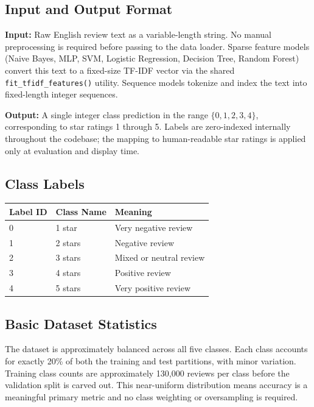 \documentclass[12pt]{article}
\begin{document}
\subsection{Input and Output Format}

\textbf{Input:} Raw English review text as a variable-length string. No manual preprocessing is required before passing to the data loader. Sparse feature models (Naive Bayes, MLP, SVM, Logistic Regression, Decision Tree, Random Forest) convert this text to a fixed-size TF-IDF vector via the shared \texttt{fit\_tfidf\_features()} utility. Sequence models tokenize and index the text into fixed-length integer sequences.

\textbf{Output:} A single integer class prediction in the range $\{0, 1, 2, 3, 4\}$, corresponding to star ratings 1 through 5. Labels are zero-indexed internally throughout the codebase; the mapping to human-readable star ratings is applied only at evaluation and display time.

\subsection{Class Labels}

\begin{table}[H]
    \centering
    \begin{tabular}{lll}
        \toprule
        Label ID & Class Name & Meaning \\
        \midrule
        0        & 1 star     & Very negative review \\
        1        & 2 stars    & Negative review \\
        2        & 3 stars    & Mixed or neutral review \\
        3        & 4 stars    & Positive review \\
        4        & 5 stars    & Very positive review \\
        \bottomrule
    \end{tabular}
\end{table}

\subsection{Basic Dataset Statistics}

The dataset is approximately balanced across all five classes. Each class accounts for exactly 20\% of both the training and test partitions, with minor variation. Training class counts are approximately 130,000 reviews per class before the validation split is carved out. This near-uniform distribution means accuracy is a meaningful primary metric and no class weighting or oversampling is required.
\end{document}
